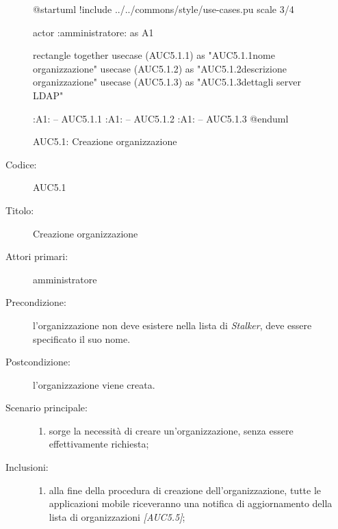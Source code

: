 \documentclass[../../../analisi-dei-requisiti.tex]{subfiles}
\begin{document}
  \begin{figure}[h!]
    \centering
    \begin{plantuml}
    @startuml
    !include ../../commons/style/use-cases.pu
    scale 3/4

    actor :amministratore: as A1

    rectangle {
      together {
        usecase (AUC5.1.1) as "AUC5.1.1\nInserisci nome organizzazione"
        usecase (AUC5.1.2) as "AUC5.1.2\nInserisci descrizione organizzazione"
        usecase (AUC5.1.3) as "AUC5.1.3\nConfigurazione dettagli server LDAP"
      }
    }

    :A1: -- AUC5.1.1
    :A1: -- AUC5.1.2
    :A1: -- AUC5.1.3
    @enduml
    \end{plantuml}
    \caption{AUC5.1: Creazione organizzazione}
    \label{fig:AUC5_1}
  \end{figure}

  \begin{description}
    \item[Codice:] AUC5.1
    \item[Titolo:] Creazione organizzazione
    \item[Attori primari:] amministratore
    \item[Precondizione:] l'organizzazione non deve esistere nella lista di \emph{Stalker}, deve essere specificato il suo nome.
    \item[Postcondizione:] l'organizzazione viene creata.
    \item[Scenario principale:]
    \begin{enumerate}
      \item sorge la necessità di creare un'organizzazione, senza essere effettivamente richiesta;
    \end{enumerate}
    \item[Inclusioni:]
    \begin{enumerate}
      \item alla fine della procedura di creazione dell'organizzazione, tutte le applicazioni mobile riceveranno una notifica di aggiornamento della lista di organizzazioni \emph{[AUC5.5]};
    \end{enumerate}
  \end{description}
\end{document}
